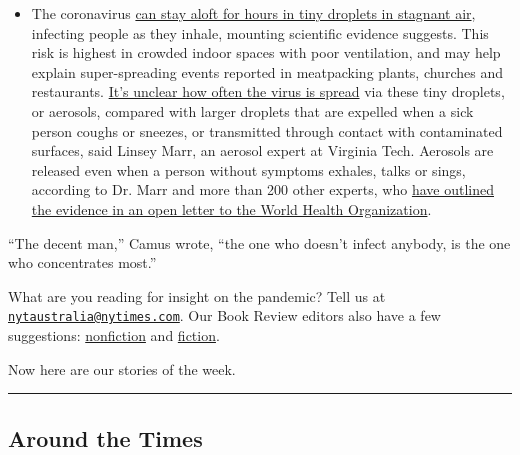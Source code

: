 \begin{itemize}
  \begin{itemize}
  \tightlist
  \item
    The coronavirus
    \href{https://www.nytimes.com/2020/07/04/health/239-experts-with-one-big-claim-the-coronavirus-is-airborne.html?action=click\&pgtype=Article\&state=default\&region=MAIN_CONTENT_3\&context=storylines_faq}{can
    stay aloft for hours in tiny droplets in stagnant air}, infecting
    people as they inhale, mounting scientific evidence suggests. This
    risk is highest in crowded indoor spaces with poor ventilation, and
    may help explain super-spreading events reported in meatpacking
    plants, churches and restaurants.
    \href{https://www.nytimes.com/2020/07/06/health/coronavirus-airborne-aerosols.html?action=click\&pgtype=Article\&state=default\&region=MAIN_CONTENT_3\&context=storylines_faq}{It's
    unclear how often the virus is spread} via these tiny droplets, or
    aerosols, compared with larger droplets that are expelled when a
    sick person coughs or sneezes, or transmitted through contact with
    contaminated surfaces, said Linsey Marr, an aerosol expert at
    Virginia Tech. Aerosols are released even when a person without
    symptoms exhales, talks or sings, according to Dr. Marr and more
    than 200 other experts, who
    \href{https://academic.oup.com/cid/article/doi/10.1093/cid/ciaa939/5867798}{have
    outlined the evidence in an open letter to the World Health
    Organization}.
  \end{itemize}
\end{itemize}

``The decent man,'' Camus wrote, ``the one who doesn't infect anybody,
is the one who concentrates most.''

What are you reading for insight on the pandemic? Tell us at
\href{mailto:nytaustralia@nytimes.com}{\nolinkurl{nytaustralia@nytimes.com}}.
Our Book Review editors also have a few suggestions:
\href{https://www.nytimes.com/2020/02/24/books/pandemic-books-coronavirus.html}{nonfiction}
and
\href{https://www.nytimes.com/2020/03/12/books/coronavirus-reading.html}{fiction}.

Now here are our stories of the week.

\begin{center}\rule{0.5\linewidth}{\linethickness}\end{center}

\hypertarget{around-the-times}{%
\subsection{Around the Times}\label{around-the-times}}

